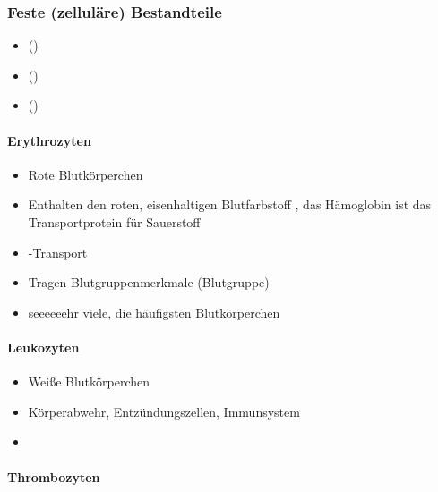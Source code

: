 \subsubsection{Feste (zelluläre) Bestandteile}

\begin{itemize}
    \item {} ()
    \item {} ()
    \item {} ()
\end{itemize}

\paragraph{Erythrozyten} 

\begin{itemize}
    \item Rote Blutkörperchen
    \item Enthalten den roten, eisenhaltigen Blutfarbstoff
    , das Hämoglobin ist
    das Transportprotein für Sauerstoff
    \item {}-Transport
    \item Tragen Blutgruppenmerkmale (Blutgruppe)
    \item seeeeeehr viele, die häufigsten Blutkörperchen
\end{itemize}

\paragraph{Leukozyten}   

\begin{itemize}
    \item Weiße Blutkörperchen
    \item Körperabwehr, Entzündungszellen, Immunsystem 
    \item
\end{itemize}

\paragraph{Thrombozyten}

